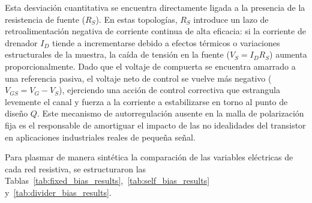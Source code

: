 \documentclass[conference]{IEEEtran}
\begin{document}
Esta desviación cuantitativa se encuentra directamente ligada a la presencia de
la resistencia de fuente ($R_S$). En estas topologías, $R_S$ introduce un lazo
de retroalimentación negativa de corriente continua de alta eficacia: si la
corriente de drenador $I_D$ tiende a incrementarse debido a efectos térmicos o
variaciones estructurales de la muestra, la caída de tensión en la fuente ($V_S
    = I_D R_S$) aumenta proporcionalmente. Dado que el voltaje de compuerta se
encuentra amarrado a una referencia pasiva, el voltaje neto de control se
vuelve más negativo ($V_{GS} = V_G - V_S$), ejerciendo una acción de control
correctiva que estrangula levemente el canal y fuerza a la corriente a
estabilizarse en torno al punto de diseño $Q$. Este mecanismo de
autorregulación ausente en la malla de polarización fija es el responsable de
amortiguar el impacto de las no idealidades del transistor en aplicaciones
industriales reales de pequeña señal.

Para plasmar de manera sintética la comparación de las variables eléctricas de
cada red resistiva, se estructuraron las
Tablas~\ref{tab:fixed_bias_results},~\ref{tab:self_bias_results}
y~\ref{tab:divider_bias_results}.

\begin{table}[htbp]
    \caption{Comparativa de Resultados Teóricos vs. Experimentales para la Red de Polarización Fija (\textit{Fixed-Bias})}\label{tab:fixed_bias_results}
    \centering
\end{table}
\end{document}
